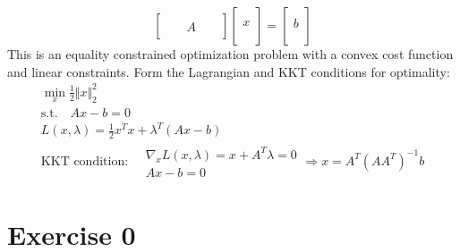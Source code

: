 \begin{itemize}
    \begin{equation}
        \begin{bmatrix}
        &  &  &  & \\
        &  & A &  & \\
        &  &  &  & 
        \end{bmatrix}\begin{bmatrix}
        \\
        \\
        x\\
        \\
        \\
        \end{bmatrix} =\begin{bmatrix}
        \\
        b\\
        \\
        \end{bmatrix}
    \end{equation}
    This is an equality constrained optimization problem with a convex cost function and linear constraints. Form the Lagrangian and KKT conditions for optimality:
    \begin{equation}
        \begin{gathered}
            \min_{x}\frac{1}{2}\Vert x\Vert _{2}^{2}\\
            \text{s.t.} \quad Ax-b=0\\
            L( x,\lambda ) =\frac{1}{2} x^{T} x+\lambda ^{T}( Ax-b)\\
            \text{KKT condition:} \quad \begin{matrix}
            \nabla _{x} L( x,\lambda ) =x+A^{T} \lambda =0\\
            Ax-b=0
            \end{matrix} \Rightarrow x=A^{T}\left( AA^{T}\right)^{-1} b
        \end{gathered}
    \end{equation}
\end{itemize}
\section{Exercise 0}